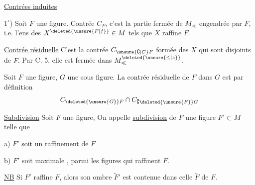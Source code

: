 \uline{Contrées induites}

$1^\circ$) Soit $F$ une figure. Contrée  $C_F$,  c'est la partie fermée de $M_{\ll}$ engendrée par $F$, i.e. l'ens des $X^{\deleted{\unsure{F|f}}}\in M$ tels que $X$ raffine $F$.

\uline{Contrée résiduelle} C'est la  contrée $C_{\unsure{\complement|C}F}$  formée des $X$  qui sont disjoints de $F$. Par C. 5, elle est   fermée dans $M^{\deleted{\unsure{\leq|z}}}_{\ll}$.

 Soit $F$ une figure, $G$ une  sous figure. La contrée résiduelle de $F$ dans $G$ est par définition
\[
 C_{\deleted{\unsure{G}}F}\cap C_{\complement\deleted{\unsure{F}}G}
\]

\uline{Subdivision} Soit $F$  une figure,  On appelle \uline{subdivision} de $F$ une figure $F'\subset M$ telle que

a) $F'$ soit un raffinement de $F$

b) $F'$ soit maximale , parmi les  figures qui raffinent $F$.

\uline{NB} Si $F'$ raffine $F$, alors son ombre $\widetilde F'$ est contenue dans celle $\widetilde F$ de $F$.
